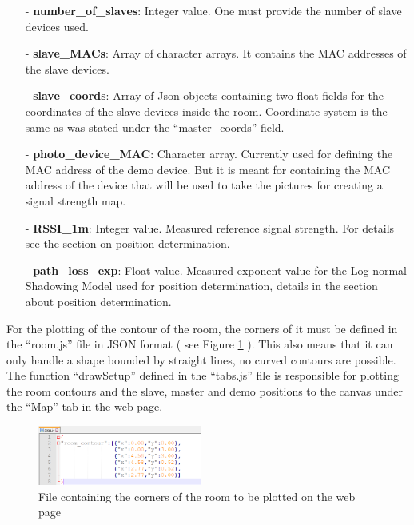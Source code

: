 \documentclass[11pt,a4paper]{article}
\numberwithin{equation}{section}   %
\numberwithin{figure}{section}     %
\numberwithin{table}{section}      %
\begin{document}
\begin{itemize}
\item[-] \textbf{number\_of\_slaves}: Integer value. One must provide the number of slave devices used.\\

\item[-] \textbf{slave\_MACs}: Array of character arrays. It contains the MAC addresses of the slave devices.\\

\item[-] \textbf{slave\_coords}: Array of Json objects containing two float fields for the coordinates of the slave devices inside the room. Coordinate system is the same as was stated under the ``master\_coords'' field.\\

\item[-] \textbf{photo\_device\_MAC}: Character array. Currently used for defining the MAC address of the demo device. But it is meant for containing the MAC address of the device that will be used to take the pictures for creating a signal strength map.\\

\item[-] \textbf{RSSI\_1m}: Integer value. Measured reference signal strength. For details see the section on position determination.\\

\item[-] \textbf{path\_loss\_exp}: Float value. Measured exponent value for the Log-normal Shadowing Model used for position determination, details in the section about position determination.\\

\end{itemize}

For the plotting of the contour of the room, the corners of it must be defined in the ``room.js'' file in JSON format ( see Figure \ref{fig:roomContour} ). This also means that it can only handle a shape bounded by straight lines, no curved contours are possible. The function ``drawSetup'' defined in the ``tabs.js'' file is responsible for plotting the room contours and the slave, master and demo positions to the canvas under the ``Map'' tab in the web page.


\begin{figure}[H]
    \centering
    \includegraphics[width = 0.48\textwidth]{figures/roomData.png}
    \caption{File containing the corners of the room to be plotted on the web page}
    \label{fig:roomContour}
\end{figure}
\end{document}
